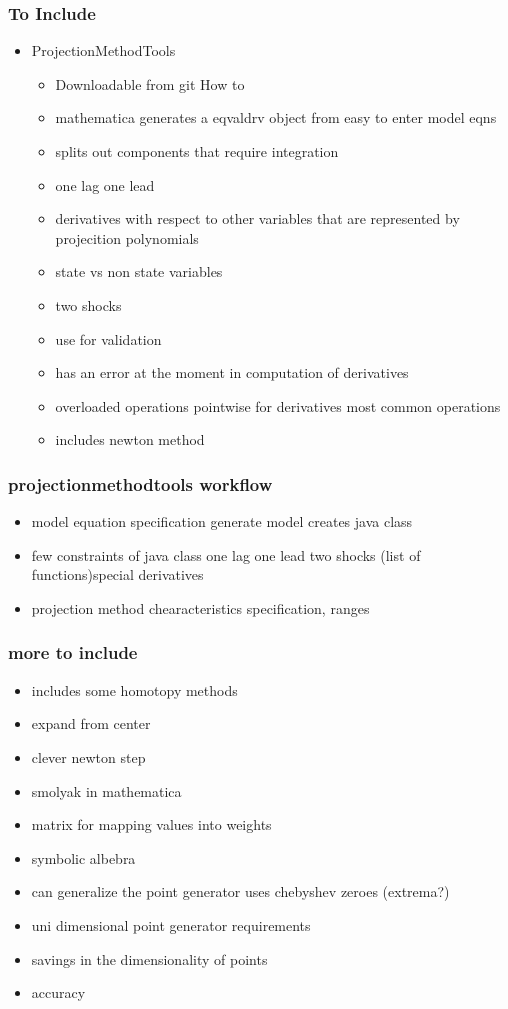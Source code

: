 \documentclass[tikz]{beamer}
\begin{document}
\begin{frame}
  \frametitle{To Include}
  \begin{itemize}
  \item ProjectionMethodTools
    \begin{itemize}
    \item Downloadable from git  How to
    \item mathematica generates a eqvaldrv object from easy to enter model eqns
    \item splits out components that require integration
    \item one lag one lead
    \item derivatives with respect to other variables that are represented by projecition polynomials
    \item state vs non state variables
    \item two shocks
    \item use for validation
    \item has an error at the moment in computation of derivatives
    \item overloaded operations pointwise for derivatives most common operations
    \item includes newton method
    \end{itemize}

  \end{itemize}
\end{frame}

\begin{frame}
  \frametitle{projectionmethodtools workflow}
  \begin{itemize}
  \item model equation specification generate model creates java class
  \item few constraints of java class  one lag one lead two shocks (list of functions)special derivatives
  \item projection method chearacteristics specification, ranges
  \end{itemize}
\end{frame}


\begin{frame}
  \frametitle{more to include}
  \begin{itemize}
    \item includes some homotopy methods
    \item expand from center
    \item clever newton step
  \item smolyak in mathematica
  \item matrix for mapping values into weights
  \item symbolic albebra
  \item can generalize the point generator uses chebyshev zeroes (extrema?)
  \item uni dimensional point generator requirements
  \item savings in the dimensionality of points
  \item accuracy
  \end{itemize}
\end{frame}
\end{document}
